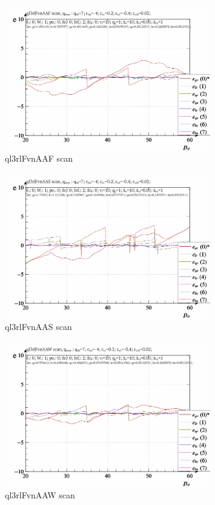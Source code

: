 \documentclass[a4paper,10pt]{article}
\begin{document}
\begin{figure}[htb!]
  \centerline{
    \includegraphics[width=0.8\textwidth]{qls-p_p_e_ql3rlFvnAAF_scan.png}
  }
  \caption{ql3rlFvnAAF scan}
  \label{atu:f:ql3rlFvnAAF_scan}
\end{figure}

\begin{figure}[htb!]
  \centerline{
    \includegraphics[width=0.8\textwidth]{qls-p_p_e_ql3rlFvnAAS_scan.png}
  }
  \caption{ql3rlFvnAAS scan}
  \label{atu:f:ql3rlFvnAAS_scan}
\end{figure}

\begin{figure}[htb!]
  \centerline{
    \includegraphics[width=0.8\textwidth]{qls-p_p_e_ql3rlFvnAAW_scan.png}
  }
  \caption{ql3rlFvnAAW scan}
  \label{atu:f:ql3rlFvnAAW_scan}
\end{figure}
\end{document}
